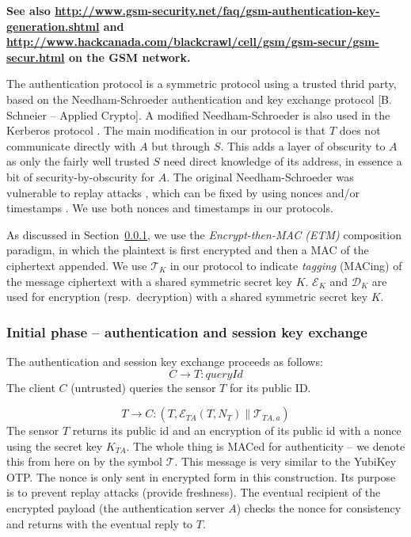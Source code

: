\textbf{See also \url{http://www.gsm-security.net/faq/gsm-authentication-key-generation.shtml} and \url{http://www.hackcanada.com/blackcrawl/cell/gsm/gsm-secur/gsm-secur.html} on the GSM network.}

The authentication protocol is a symmetric protocol using a trusted thrid party, based on the Needham-Schroeder authentication and key exchange protocol  [B. Schneier -- Applied Crypto]. A modified Needham-Schroeder is also used in the Kerberos protocol . The main modification in our protocol is that $T$ does not communicate directly with $A$ but through $S$. This adds a layer of obscurity to $A$ as only the fairly well trusted $S$ need direct knowledge of its address, in essence a bit of security-by-obscurity for $A$.
%
The original Needham-Schroeder was vulnerable to replay attacks , which can be fixed by using nonces and/or timestamps \cite{needham1987}. We use both nonces and timestamps in our protocols.

As discussed in Section~\ref{}, we use the \textit{Encrypt-then-MAC (ETM)}  composition paradigm, in which the plaintext is first encrypted and then a MAC of the ciphertext appended. We use $\mathcal{T}_K$ in our protocol to indicate \textit{tagging} (MACing) of the message ciphertext with a shared symmetric secret key $K$. $\mathcal{E}_K$ and $\mathcal{D}_K$ are used for encryption (resp.\ decryption) with a shared symmetric secret key $K$.

\subsubsection{Initial phase -- authentication and session key exchange}

The authentication and session key exchange proceeds as follows:
\[
C \rightarrow T: \textit{queryId}
\]
The client $C$ (untrusted) queries the sensor $T$ for its public ID.

\[
T \rightarrow C: (T,\mathcal{E}_{TA}(T,N_T) \parallel \mathcal{T}_{TA,a})
\]
The sensor $T$ returns its public id and an encryption of its public id with a nonce using the secret key $K_{TA}$. The whole thing is MACed for authenticity -- we denote this from here on by the symbol $\mathcal{T}$. This message is very similar to the YubiKey OTP. The nonce is only sent in encrypted form in this construction. Its purpose is to prevent replay attacks (provide freshness). The eventual recipient of the encrypted payload (the authentication server $A$) checks the nonce for consistency and returns with the eventual reply to $T$.

